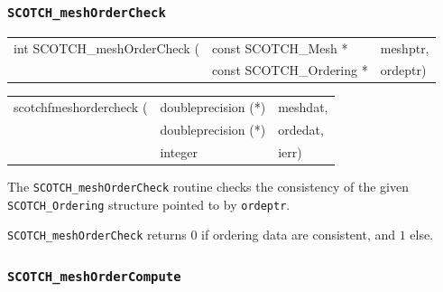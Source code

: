 \subsubsection{{\tt SCOTCH\_meshOrderCheck}}

\begin{itemize}
\progsyn

{\tt\begin{tabular}{l@{}ll}
int SCOTCH\_meshOrderCheck ( & const SCOTCH\_Mesh *     & meshptr, \\
                             & const SCOTCH\_Ordering * & ordeptr)
\end{tabular}}

{\tt\begin{tabular}{l@{}ll}
scotchfmeshordercheck ( & doubleprecision (*) & meshdat, \\
                        & doubleprecision (*) & ordedat, \\
                        & integer             & ierr)
\end{tabular}}

\progdes

The {\tt SCOTCH\_meshOrderCheck} routine checks the consistency of
the given {\tt SCOTCH\_\lbt Ordering} structure pointed to by {\tt ordeptr}.

\progret

{\tt SCOTCH\_meshOrderCheck} returns $0$ if ordering data are consistent, and
$1$ else.

\end{itemize}

\subsubsection{{\tt SCOTCH\_meshOrderCompute}}

